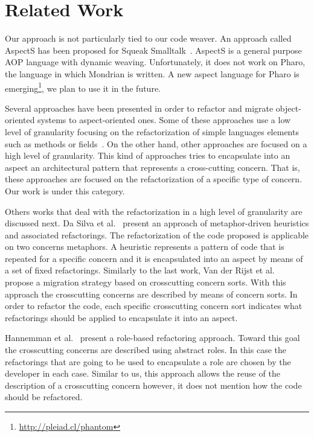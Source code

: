 \documentclass[preprint,10pt]{sigplanconf}
\newcommand{\seclabel}[1]{\label{sec:#1}}
\begin{document}
\section{Related Work}\seclabel{relatedWork}
Our approach is not particularly tied to our code weaver. An approach called AspectS has been proposed for Squeak Smalltalk~\cite{Hirschfeld2002}. AspectS is a general purpose AOP language with dynamic weaving. Unfortunately, it does not work on Pharo, the language in which Mondrian is written. A new aspect language for Pharo is emerging\footnote{\url{http://pleiad.cl/phantom}}, we plan to use it in the future.

Several approaches have been presented in order to refactor and migrate object-oriented systems to aspect-oriented ones. Some of these approaches use a low level of granularity focusing on the refactorization of simple languages elements such as methods or fields~\cite{Ceccato2008,Tonella2005,Binkley2005,Deursen2005,Hannemann2003}. 
On the other hand, other approaches are focused on a high level of granularity. This kind of approaches tries to encapsulate into an aspect an architectural pattern that represents a cross-cutting concern. That is, these approaches are focused on the refactorization of a specific type of concern. Our work is under this category. 

Others works that deal with the refactorization in a high level of granularity are discussed next. Da Silva et al.~\cite{Silva2009} present an approach of metaphor-driven heuristics and associated refactorings. The refactorization of the code proposed is applicable on two concerns metaphors. A heuristic represents a pattern of code that is repeated for a specific concern and it is encapsulated into an aspect by means of a set of fixed refactorings. Similarly to the last work, Van der Rijst et al.~\cite{Rijst2008,Marin2009} propose a migration strategy based on crosscutting concern sorts. With this approach the crosscutting concerns are described by means of concern sorts. In order to refactor the code, each specific crosscutting concern sort indicates what refactorings should be applied to encapsulate it into an aspect.%

Hannemman et al.~\cite{Hannemann2005} present a role-based refactoring approach. Toward this goal the crosscutting concerns are described using abstract roles. In this case the refactorings that are going to be used to encapsulate a role are chosen by the developer in each case. Similar to us, this approach allows the reuse of the description of a crosscutting concern however, it does not mention how the code should be refactored.
\end{document}
